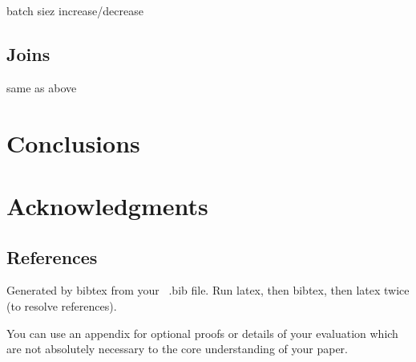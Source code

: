 \documentclass{vldb}
\begin{document}
batch siez increase/decrease

\subsection{Joins}
same as above
\section{Conclusions}

\balance

\section{Acknowledgments}




\subsection{References}
Generated by bibtex from your ~.bib file.  Run latex,
then bibtex, then latex twice (to resolve references).


\begin{appendix}
You can use an appendix for optional proofs or details of your evaluation which are not absolutely necessary to the core understanding of your paper. 


\end{appendix}
\end{document}
